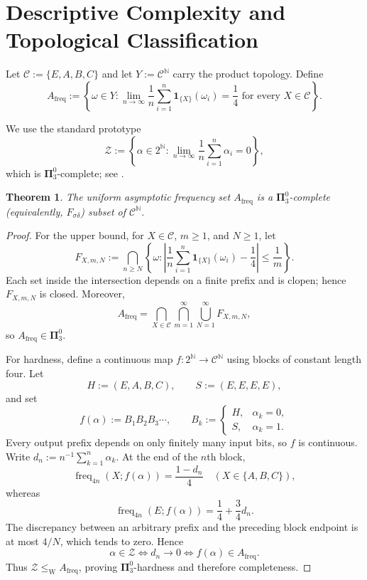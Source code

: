 \documentclass[11pt,a4paper]{article}
\newtheorem{theorem}{Theorem}
\begin{document}
\section{Descriptive Complexity and Topological Classification}

Let $\mathcal C:=\{E,A,B,C\}$ and let
$Y:=\mathcal C^{\mathbb N}$ carry the product topology. Define
\[
A_{\mathrm{freq}}
:=\left\{\omega\in Y:
\lim_{n\to\infty}\frac1n
\sum_{i=1}^n\mathbf 1_{\{X\}}(\omega_i)=\frac14
\text{ for every }X\in\mathcal C\right\}.
\]

We use the standard prototype
\[
\mathcal Z
:=\left\{\alpha\in2^{\mathbb N}:
\lim_{n\to\infty}\frac1n\sum_{i=1}^n\alpha_i=0\right\},
\]
which is $\mathbf{\Pi}^0_3$-complete; see \cite{KiLinton1994}.

\begin{theorem}
The uniform asymptotic frequency set $A_{\mathrm{freq}}$ is a
$\mathbf{\Pi}^0_3$-complete (equivalently, $F_{\sigma\delta}$) subset of
$\mathcal C^{\mathbb N}$.
\end{theorem}

\begin{proof}
For the upper bound, for $X\in\mathcal C$, $m\ge1$, and $N\ge1$, let
\[
F_{X,m,N}
:=\bigcap_{n\ge N}
\left\{\omega:\left|
\frac1n\sum_{i=1}^n\mathbf 1_{\{X\}}(\omega_i)-\frac14
\right|\le\frac1m\right\}.
\]
Each set inside the intersection depends on a finite prefix and is clopen;
hence $F_{X,m,N}$ is closed. Moreover,
\[
A_{\mathrm{freq}}
=\bigcap_{X\in\mathcal C}\bigcap_{m=1}^\infty
\bigcup_{N=1}^\infty F_{X,m,N},
\]
so $A_{\mathrm{freq}}\in\mathbf{\Pi}^0_3$.

For hardness, define a continuous map
$f:2^{\mathbb N}\to\mathcal C^{\mathbb N}$ using blocks of constant length
four. Let
\[
H:=(E,A,B,C),
\qquad
S:=(E,E,E,E),
\]
and set
\[
f(\alpha):=B_1B_2B_3\cdots,
\qquad
B_k:=\begin{cases}
H,&\alpha_k=0,\\
S,&\alpha_k=1.
\end{cases}
\]
Every output prefix depends on only finitely many input bits, so $f$ is
continuous. Write $d_n:=n^{-1}\sum_{k=1}^n\alpha_k$. At the end of the
$n$th block,
\[
\operatorname{freq}_{4n}(X;f(\alpha))
=\frac{1-d_n}{4}
\quad(X\in\{A,B,C\}),
\]
whereas
\[
\operatorname{freq}_{4n}(E;f(\alpha))
=\frac14+\frac34d_n.
\]
The discrepancy between an arbitrary prefix and the preceding block endpoint
is at most $4/N$, which tends to zero. Hence
\[
\alpha\in\mathcal Z
\iff d_n\to0
\iff f(\alpha)\in A_{\mathrm{freq}}.
\]
Thus $\mathcal Z\le_{\mathrm W}A_{\mathrm{freq}}$, proving
$\mathbf{\Pi}^0_3$-hardness and therefore completeness.
\end{proof}
\end{document}
